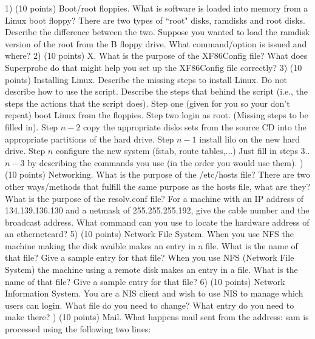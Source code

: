

\parindent=0in
\nopagenumbers
{}
\bigskip
\parindent=0pt
1) (10 points) 
Boot/root floppies. 
\hfil\break
What is software is loaded into memory from a Linux boot floppy?
\vskip0.5in
There are two types of ``root" disks, ramdisks and root disks.
Describe the difference between the two.
\vskip0.8in
Suppose you wanted to load the ramdisk version of the root from the B
floppy drive.
What command/option is issued and where?
\vskip0.5in
2) (10 points) 
X. 
\hfil\break
What is the purpose of the XF86Config file?
\vskip0.5in
What does Superprobe do that might help you set up
the XF86Config file correctly?
\vskip0.7in
3) (10 points) 
Installing Linux. 
\hfil\break
Describe the missing steps to install Linux. 
Do not describe how to use the script.
Describe the steps that behind the script (i.e., the steps the actions
that the script does).
Step one (given for you so your don't repeat) boot Linux from the floppies.
Step two login as root.
(Missing steps to be filled in).
Step $n-2$ copy the appropriate disks sets from the source CD into the 
appropriate partitions of the hard drive.
Step $n-1$ install lilo on the new hard drive.
Step $n$ configure the new system (fstab, route tables,...)
Just fill in steps 3..$n-3$ by describing the commands you use (in the order
you would use them).
\vfill{}) (10 points) 
Networking. 
\hfil\break
What is the purpose of the /etc/hosts file?
\vskip0.5in
There are two other ways/methods that fulfill the same purpose as the
hosts file, what are they?
\vskip0.5in
What is the purpose of the resolv.conf file?
\vskip0.5in
For a machine with an IP address of 134.139.136.130 and a netmask of 
255.255.255.192, give the cable number and the broadcast address.
\vskip0.8in
What command can you use to locate the hardware address of an ethernetcard?
\vskip0.5in
5) (10 points) 
Network File System. 
\hfil\break
When you use NFS the machine making the disk avaible
makes an entry in a file. 
What is the name of that file?
\vskip0.5in
Give a sample entry for that file?
\vskip0.5in
When you use NFS (Network File System) the machine using a remote disk 
makes an entry in a file. 
What is the name of that file?
\vskip0.5in
Give a sample entry for that file?
\vskip0.5in
6) (10 points) 
Network Information System.
\hfil\break
You are a NIS client and wish to use NIS to manage which users can login.
What file do you need to change?
\vskip0.5in
What entry do you need to make there?
\vskip0.5in
\vfill{}) (10 points) 
Mail. 
\hfil\break
What happens mail sent from the address:
\hfill\break
{\ltt{}sam}
\hfill\break
is processed using the following two lines:

